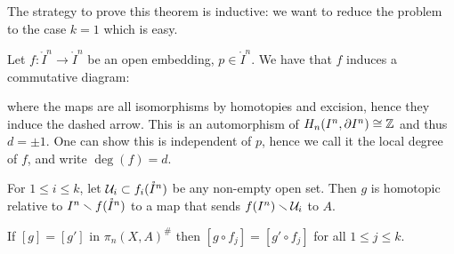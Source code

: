 \label{fig:HAT1}\medskip

The strategy to prove this theorem is inductive: we want to reduce the problem to the case $k=1$ which is easy.

\begin{definition}
Let $f:\ring I^n\to\ring I^n $ be an open embedding, $p\in\ring I^n$. We have that $f$ induces a commutative diagram:
\begin{center}
\end{center}
\end{definition}
where the maps are all isomorphisms by homotopies and excision, hence they induce the dashed arrow. This is an automorphism of $H_n(I^n,\partial I^n)\cong{\mathbb Z}$ and thus $d=\pm1$. One can show this is independent of $p$, hence we call it the local degree of $f$, and write $\deg(f)=d$.

\begin{lemma}
For $1\leq i\leq k$, let $\mathcal{U}_i\subset f_i(\mathring I^n)$ be any non-empty open set. Then $g$ is homotopic relative to $I^n\smallsetminus f(\mathring{I}^n)$ to a map that sends $f(I^n)\smallsetminus\mathcal{U}_i$ to $A$.
\end{lemma}

\begin{remark}
If $[g]=[g']$ in $\pi_n(X,A)^\#$ then $[g\circ f_j]=[g'\circ f_j]$ for all $1\leq j\leq k$.
\end{remark}

